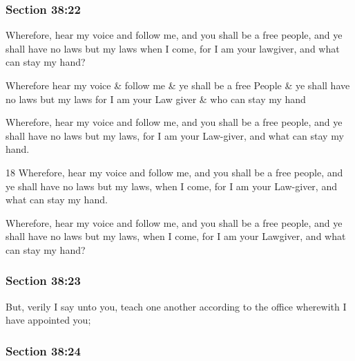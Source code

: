 	\subsubsection{Section 38:22} %
		\label{DC38-22}

		Wherefore, hear my voice and follow me, and you shall be a free people, and ye shall have no laws but my laws when I come, for I am your lawgiver, and what can stay my hand?

		\begin{framed}
		\scriptsize
			\begin{compactdesc}
				\item[JSP] Wherefore hear my voice \& follow me \& ye shall be a free People \& ye shall have no laws but my laws for I am your Law giver \& who can stay my hand
				\item[EMS] Wherefore, hear my voice and follow me, and you shall be a free people, and ye shall have no laws but my laws, for I am your Law-giver, and what can stay my hand.
				\item[BC] 18 Wherefore, hear my voice and follow me, and you shall be a free people, and ye shall have no laws but my laws, when I come, for I am your Law-giver, and what can stay my hand.
				\item[DC 1835] Wherefore, hear my voice and follow me, and you shall be a free people, and ye shall have no laws but my laws, when I come, for I am your Lawgiver, and what can stay my hand?
			\end{compactdesc}
		\end{framed}

	\subsubsection{Section 38:23} %
		\label{DC38-23}

		But, verily I say unto you, teach one another according to the office wherewith I have appointed you;


	\subsubsection{Section 38:24} %
		\label{DC38-24}

